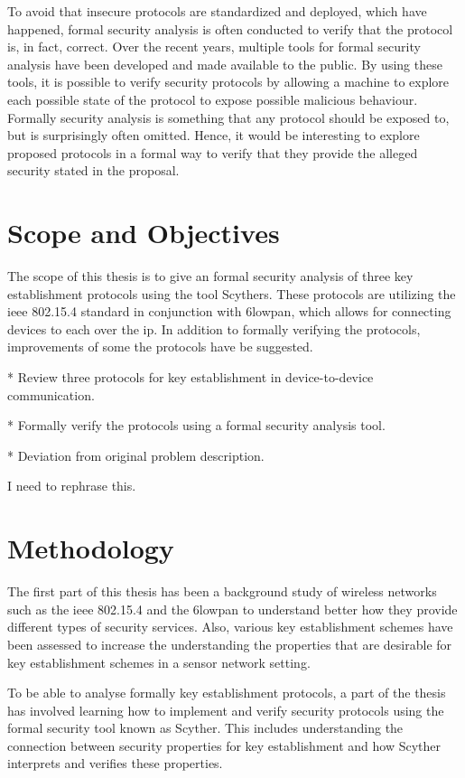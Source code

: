 To avoid that insecure protocols are standardized and deployed, which have happened, formal security analysis is often conducted to verify that the protocol is, in fact, correct. Over the recent years, multiple tools for formal security analysis have been developed and made available to the public. By using these tools, it is possible to verify security protocols by allowing a machine to explore each possible state of the protocol to expose possible malicious behaviour. Formally security analysis is something that any protocol should be exposed to, but is surprisingly often omitted. Hence, it would be interesting to explore proposed protocols in a formal way to verify that they provide the alleged security stated in the proposal.

\section{Scope and Objectives}

The scope of this thesis is to give an formal security analysis of three key establishment protocols using the tool Scythers. These protocols are utilizing the \gls{ieee} 802.15.4 standard in conjunction with \gls{6lowpan}, which allows for connecting devices to each over the \gls{ip}. In addition to formally verifying the protocols, improvements of some the protocols have be suggested. 

* Review three protocols for key establishment in device-to-device communication.

* Formally verify the protocols using a formal security analysis tool.

* Deviation from original problem description.


I need to rephrase this.

\section{Methodology}

The first part of this thesis has been a background study of wireless networks such as the \gls{ieee} 802.15.4 and the \gls{6lowpan} to understand better how they provide different types of security services. Also, various key establishment schemes have been assessed to increase the understanding the properties that are desirable for key establishment schemes in a sensor network setting.

To be able to analyse formally key establishment protocols, a part of the thesis has involved learning how to implement and verify security protocols using the formal security tool known as Scyther. This includes understanding the connection between security properties for key establishment and how Scyther interprets and verifies these properties.

